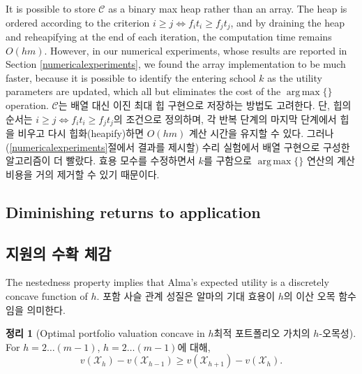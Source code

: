 \documentclass[11pt]{article} %
\DeclareMathOperator*{\argmax}{arg\,max}
\newtheorem{theorem}{Theorem}
\theoremstyle{definition}
\newtheorem{theorem}{정리}
\theoremstyle{definition}
\begin{document}
\ifen 
It is possible to store $\mathcal{C}$ as a binary max heap rather than an array. The heap is ordered according to the criterion $i \geq j \iff f_i t_i \geq f_j t_j$, and by draining the heap and reheapifying at the end of each iteration, the computation time remains $O(hm)$. However, in our numerical experiments, whose results are reported in Section \ref{numericalexperiments},
we found the array implementation to be much faster, because it is possible to identify the entering school $k$ as the utility parameters are updated, which all but eliminates the cost of the $\argmax\{\}$ operation. 
\else
$\mathcal{C}$는 배열 대신 이진 최대 힙 구현으로 저장하는 방법도 고려한다. 단, 힙의 순서는 $i \geq j \iff f_i t_i \geq f_j t_j$의 조건으로 정의하며, 각 반복 단계의 마지막 단계에서 힙을 비우고 다시 힙화(heapify)하면 $O(hm)$ 계산 시간을 유지할 수 있다. 그러나 (\ref{numericalexperiments}절에서 결과를 제시할) 수리 실험에서 배열 구현으로 구성한 알고리즘이 더 빨랐다. 효용 모수를 수정하면서 $k$를 구함으로 $\argmax\{\}$ 연산의 계산 비용을 거의 제거할 수 있기 때문이다.
\fi


\ifen \subsection{Diminishing returns to application} \else\subsection{지원의 수확 체감} \fi
\ifen The nestedness property implies that Alma's expected utility is a discretely concave function of $h$.
\else 포함 사슬 관계 성질은 알마의 기대 효용이 $h$의 이산 오목 함수임을 의미한다.\fi

\begin{theorem}[\ifen Optimal portfolio valuation concave in $h$\else 최적 포트폴리오 가치의 $h$-오목성\fi] \label{concavityinh}
\ifen For $h = 2 \dots (m-1)$,
\else $h = 2 \dots (m-1)$에 대해,\fi
\begin{equation}v(\mathcal{X}_h) - v(\mathcal{X}_{h-1}) \geq v(\mathcal{X}_{h+1}) - v(\mathcal{X}_{h}).\end{equation} 
\end{theorem}
\end{document}

